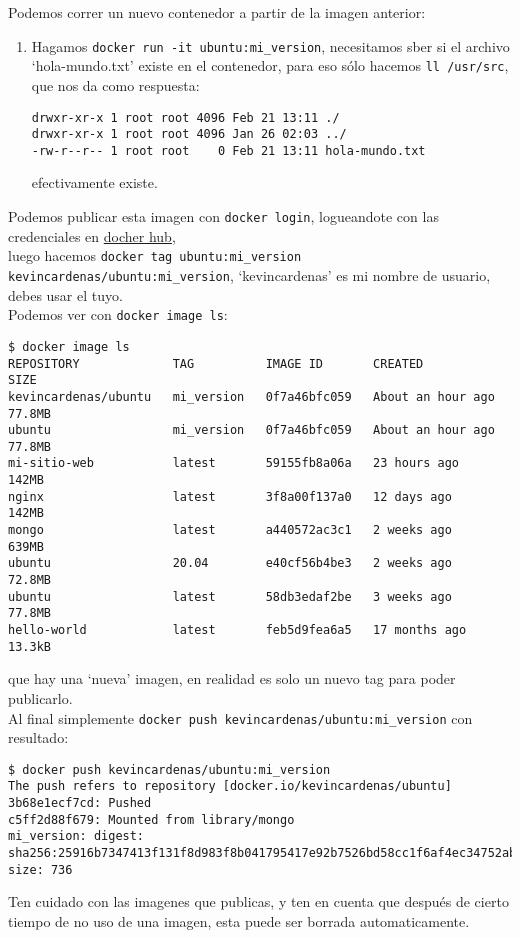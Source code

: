 \documentclass{article}
\begin{document}
Podemos correr un nuevo contenedor a partir de la imagen anterior:
\begin{enumerate}
      \item Hagamos \lstinline{docker run -it ubuntu:mi_version}, necesitamos sber si el archivo \enquote*{hola-mundo.txt} existe en el contenedor, para eso sólo hacemos \lstinline{ll /usr/src}, que nos da como respuesta:
      \begin{lstlisting}[numbers=none]
drwxr-xr-x 1 root root 4096 Feb 21 13:11 ./
drwxr-xr-x 1 root root 4096 Jan 26 02:03 ../
-rw-r--r-- 1 root root    0 Feb 21 13:11 hola-mundo.txt \end{lstlisting}
            efectivamente existe.
\end{enumerate}
Podemos publicar esta imagen con \lstinline{docker login}, logueandote con las credenciales en \href{https://hub.docker.com/}{docher hub},\\
luego hacemos \lstinline{docker tag ubuntu:mi_version kevincardenas/ubuntu:mi_version}, \enquote*{kevincardenas} es mi nombre de usuario, debes usar el tuyo.\\ 
Podemos ver con \lstinline{docker image ls}:
\begin{lstlisting}[numbers=none]
$ docker image ls
REPOSITORY             TAG          IMAGE ID       CREATED             SIZE
kevincardenas/ubuntu   mi_version   0f7a46bfc059   About an hour ago   77.8MB
ubuntu                 mi_version   0f7a46bfc059   About an hour ago   77.8MB
mi-sitio-web           latest       59155fb8a06a   23 hours ago        142MB
nginx                  latest       3f8a00f137a0   12 days ago         142MB
mongo                  latest       a440572ac3c1   2 weeks ago         639MB
ubuntu                 20.04        e40cf56b4be3   2 weeks ago         72.8MB
ubuntu                 latest       58db3edaf2be   3 weeks ago         77.8MB
hello-world            latest       feb5d9fea6a5   17 months ago       13.3kB      \end{lstlisting}
que hay una \enquote*{nueva} imagen, en realidad es solo un nuevo tag para poder publicarlo.\\
Al final simplemente \lstinline{docker push kevincardenas/ubuntu:mi_version} con resultado:
\begin{lstlisting}[numbers=none]
$ docker push kevincardenas/ubuntu:mi_version
The push refers to repository [docker.io/kevincardenas/ubuntu]
3b68e1ecf7cd: Pushed 
c5ff2d88f679: Mounted from library/mongo 
mi_version: digest: sha256:25916b7347413f131f8d983f8b041795417e92b7526bd58cc1f6af4ec34752ab size: 736\end{lstlisting}
Ten cuidado con las imagenes que publicas, y ten en cuenta que después de cierto  tiempo de no uso de una imagen, esta puede ser borrada automaticamente.
\end{document}
